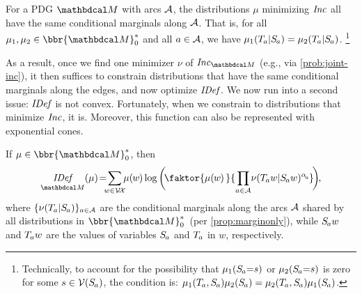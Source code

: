 \documentclass[twoside]{article}
\begin{document}
\begin{prop}\label{prop:marginonly}

    For a PDG $\dg M$ with arcs $\mathcal A$,
    the distributions $\mu$ minimizing $\mathit{Inc}$ all have the same conditional
        marginals along $\mathcal A$.
    That is, for all $\mu_1, \mu_2 \in \bbr{\dg M}_0^*$
    and all $a \in \mathcal A$,
    we have
    $\mu_1(\Tgt a | \Src a) = \mu_2(\Tgt a | \Src a)$.%
    \footnote{
        Technically, to account for the possibility that
        $\mu_1(\Src a {=} s)$ or $\mu_2(\Src a {=} s)$ is zero for some $s \in \V(\Src a)$,
        the condition is:
        $\mu_1(\Tgt a, \Src a)\mu_2(\Src a) = \mu_2(\Tgt a, \Src a) \mu_1(\Src a)$.%
    }
\end{prop}

As a result, once we find one minimizer $\nu$ of $\Inc_{\dg M}$
(e.g., via \eqref{prob:joint-inc}),
it then suffices to constrain distributions that have the same conditional marginals along the edges, and now optimize $\mathit{IDef}_{\!}$.
We now run into a second issue: $\mathit{IDef}_{\!}$ is not convex.
Fortunately, when we constrain to distributions that minimize $\mathit{Inc}$, it is.
Moreover, this function can also be represented with exponential cones.

\begin{prop}\label{prop:idef-frozen}
If $\mu \in \bbr{\dg M}_0^*$,
then
\vspace{-1ex}
\begin{equation}
    \underset{{\dg M}}{\IDef{}}(\mu) \!=\!
        \sum_{\mathclap{ w \in \V\!\X } }
            \mu(\mskip-1mu w \mskip-1mu)
            \log  \bigg(\!
                \faktor{\mu(\mskip-1mu w\mskip-1mu )\,}{\,\prod_{\mathclap{a \in \Ar}} \nu(\Tgt aw | \Src aw)^
                {\alpha\ssub a}
                }\!
            \bigg)\mskip-2mu
        ,
        \label{eq:idef-alt-constr}
\end{equation}
%
where $\{ \nu(\Tgt a | \Src a ) \}_{a \in \Ar}$ are the
conditional marginals along the arcs $\mathcal A$
shared by all distributions in $\bbr{\dg M}^*_0$\
(per \cref{prop:marginonly}),
while $\Src a w$ and $\Tgt a w$ are the
values of variables
$\Src a$ and $\Tgt a$
in $w$,
respectively.
\end{prop}
\end{document}
